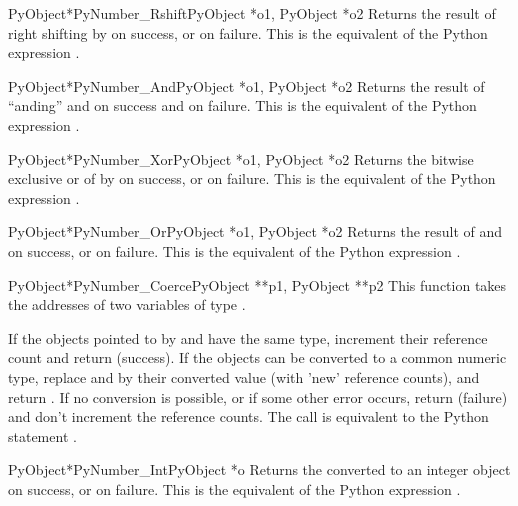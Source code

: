 \documentclass{manual}
\begin{document}
\begin{cfuncdesc}{PyObject*}{PyNumber_Rshift}{PyObject *o1, PyObject *o2}
Returns the result of right shifting  by  on success,
or \NULL{} on failure.  This is the equivalent of the Python
expression .
\end{cfuncdesc}


\begin{cfuncdesc}{PyObject*}{PyNumber_And}{PyObject *o1, PyObject *o2}
Returns the result of ``anding''  and  on success and
\NULL{} on failure. This is the equivalent of the Python
expression .
\end{cfuncdesc}


\begin{cfuncdesc}{PyObject*}{PyNumber_Xor}{PyObject *o1, PyObject *o2}
Returns the bitwise exclusive or of  by  on success,
or \NULL{} on failure.  This is the equivalent of the Python
expression .
\end{cfuncdesc}

\begin{cfuncdesc}{PyObject*}{PyNumber_Or}{PyObject *o1, PyObject *o2}
Returns the result of  and  on success, or \NULL{} on
failure.  This is the equivalent of the Python expression
.
\end{cfuncdesc}


\begin{cfuncdesc}{PyObject*}{PyNumber_Coerce}{PyObject **p1, PyObject **p2}
This function takes the addresses of two variables of type
.

If the objects pointed to by  and 
have the same type, increment their reference count and return
 (success). If the objects can be converted to a common
numeric type, replace  and  by their converted
value (with 'new' reference counts), and return .
If no conversion is possible, or if some other error occurs,
return  (failure) and don't increment the reference counts.
The call  is equivalent to the
Python statement .
\end{cfuncdesc}


\begin{cfuncdesc}{PyObject*}{PyNumber_Int}{PyObject *o}
Returns the  converted to an integer object on success, or
\NULL{} on failure.  This is the equivalent of the Python
expression .
\end{cfuncdesc}
\end{document}
